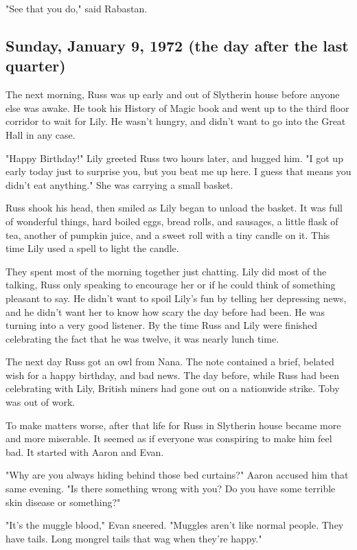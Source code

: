 "See that you do," said Rabastan.

\subsection{Sunday, January 9, 1972 (the day after the last quarter)}

The next morning, Russ was up early and out of Slytherin house before anyone else was awake. He took his History of Magic book and went up to the third floor corridor to wait for Lily. He wasn't hungry, and didn't want to go into the Great Hall in any case.

"Happy Birthday!" Lily greeted Russ two hours later, and hugged him. "I got up early today just to surprise you, but you beat me up here. I guess that means you didn't eat anything." She was carrying a small basket.

Russ shook his head, then smiled as Lily began to unload the basket. It was full of wonderful things, hard boiled eggs, bread rolls, and sausages, a little flask of tea, another of pumpkin juice, and a sweet roll with a tiny candle on it. This time Lily used a spell to light the candle.

They spent most of the morning together just chatting. Lily did most of the talking, Russ only speaking to encourage her or if he could think of something pleasant to say. He didn't want to spoil Lily's fun by telling her depressing news, and he didn't want her to know how scary the day before had been. He was turning into a very good listener. By the time Russ and Lily were finished celebrating the fact that he was twelve, it was nearly lunch time.

The next day Russ got an owl from Nana. The note contained a brief, belated wish for a happy birthday, and bad news. The day before, while Russ had been celebrating with Lily, British miners had gone out on a nationwide strike. Toby was out of work.

To make matters worse, after that life for Russ in Slytherin house became more and more miserable. It seemed as if everyone was conspiring to make him feel bad. It started with Aaron and Evan.

"Why are you always hiding behind those bed curtains?" Aaron accused him that same evening. "Is there something wrong with you? Do you have some terrible skin disease or something?"

"It's the muggle blood," Evan sneered. "Muggles aren't like normal people. They have tails. Long mongrel tails that wag when they're happy."

